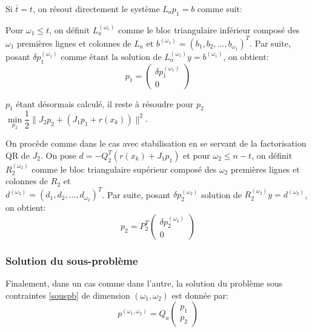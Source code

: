 \documentclass[a4paper,11pt]{article}
\numberwithin{equation}{section}
\begin{document}
Si $\bar{t}=t$, on résout directement le système $L_{a}p_{1}=b$ comme suit:

Pour $\omega_{1} \leq t$, on définit $L_{a}^{(\omega_{1})}$ comme le bloc triangulaire inférieur composé des $\omega_{1}$ premières lignes et colonnes de $L_{a}$ et $b^{(\omega_{1})}= (b_1, b_2, \ldots, b_{\omega_{1}})^T$. Par suite, posant $\delta p_1^{(\omega_{1})} \text{ comme étant la solution de } L_{a}^{(\omega_{1})}y = b^{(\omega_{1})}$, on obtient:
\begin{equation} \label{calculp1}
p_1 = \begin{pmatrix} \delta p_1^{(\omega_{1})} \\ 0 \end{pmatrix}
\end{equation}

$p_1$ étant désormais calculé, il reste à résoudre pour $p_2$ $\underset{p_2}{\min} \dfrac{1}{2}\|J_2p_2 + (J_1p_1 + r(x_{k}))\|^2$. 

On procède comme dans le cas avec stabilisation en se servant de la factorisation QR de $J_2$.
On pose $d = -Q_2^T(r(x_{k}) + J_1p_1)$ et pour $\omega_{2} \leq n-t$, on définit $R_{2}^{(\omega_{2} )}$ comme le bloc triangulaire supérieur composé des $\omega_{2}$ premières lignes et colonnes de $R_{2}$ et \\ $d^{(\omega_{2})} = (d_1, d_2, \ldots, d_{\omega_{2}})^T$.
Par suite, posant $\delta p_2^{(\omega_{2})}$ solution de $R_{2}^{(\omega_{2})}y =d^{(\omega_{2})}$, on obtient:
\begin{equation} \label{calculp2}
p_2 = P_2^T\begin{pmatrix} \delta p_2^{(\omega_{2})} \\ 0 \end{pmatrix}
\end{equation}

\subsubsection{Solution du sous-problème}
Finalement, dans un cas comme dans l'autre, la solution du problème sous contraintes \eqref{souspb} de dimension $(\omega_{1}, \omega_{2})$ est donnée par: 
\begin{equation}
{p^{(\omega_{1},\omega_{2})} = Q_{a} \begin{pmatrix} p_1 \\ p_2 \end{pmatrix}}
\end{equation}
\end{document}
